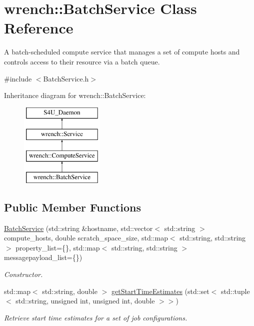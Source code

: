 \hypertarget{classwrench_1_1_batch_service}{}\section{wrench\+:\+:Batch\+Service Class Reference}
\label{classwrench_1_1_batch_service}


A batch-\/scheduled compute service that manages a set of compute hosts and controls access to their resource via a batch queue.  




{\ttfamily \#include $<$Batch\+Service.\+h$>$}

Inheritance diagram for wrench\+:\+:Batch\+Service\+:\begin{figure}[H]
\begin{center}
\leavevmode
\includegraphics[height=4.000000cm]{classwrench_1_1_batch_service}
\end{center}
\end{figure}
\subsection*{Public Member Functions}
\begin{DoxyCompactItemize}
\item 
\hyperlink{classwrench_1_1_batch_service_a2f91405c977001fa52acda0fe849f143}{Batch\+Service} (std\+::string \&hostname, std\+::vector$<$ std\+::string $>$ compute\+\_\+hosts, double scratch\+\_\+space\+\_\+size, std\+::map$<$ std\+::string, std\+::string $>$ property\+\_\+list=\{\}, std\+::map$<$ std\+::string, std\+::string $>$ messagepayload\+\_\+list=\{\})
\begin{DoxyCompactList}\small\item\em Constructor. \end{DoxyCompactList}\item 
std\+::map$<$ std\+::string, double $>$ \hyperlink{classwrench_1_1_batch_service_aef66984e61f6d36276ee8ae38ece8266}{get\+Start\+Time\+Estimates} (std\+::set$<$ std\+::tuple$<$ std\+::string, unsigned int, unsigned int, double $>$$>$)
\begin{DoxyCompactList}\small\item\em Retrieve start time estimates for a set of job configurations. \end{DoxyCompactList}\end{DoxyCompactItemize}
